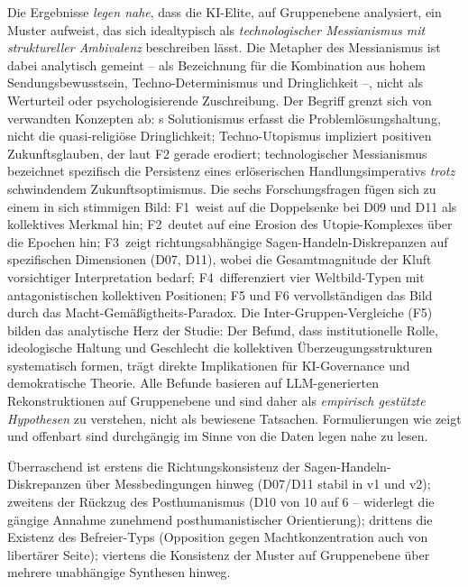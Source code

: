 \documentclass[12pt,a4paper]{article}
\begin{document}
Die Ergebnisse \emph{legen nahe}, dass die KI-Elite, auf Gruppenebene analysiert, ein Muster aufweist, das sich idealtypisch als \emph{technologischer Messianismus mit struktureller Ambivalenz} beschreiben lässt. Die Metapher des \glqq Messianismus\grqq{} ist dabei analytisch gemeint -- als Bezeichnung für die Kombination aus hohem Sendungsbewusstsein, Techno-Determinismus und Dringlichkeit --, nicht als Werturteil oder psychologisierende Zuschreibung. Der Begriff grenzt sich von verwandten Konzepten ab: \citeauthor{Morozov2013}s \glqq Solutionismus\grqq{} erfasst die Problemlösungshaltung, nicht die quasi-religiöse Dringlichkeit; \glqq Techno-Utopismus\grqq{} impliziert positiven Zukunftsglauben, der laut F2 gerade erodiert; \glqq technologischer Messianismus\grqq{} bezeichnet spezifisch die Persistenz eines erlöserischen Handlungsimperativs \emph{trotz} schwindendem Zukunftsoptimismus. Die sechs Forschungsfragen fügen sich zu einem in sich stimmigen Bild: F1~weist auf die \glqq Doppelsenke\grqq{} bei D09 und D11 als kollektives Merkmal hin; F2~deutet auf eine Erosion des Utopie-Komplexes über die Epochen hin; F3~zeigt richtungsabhängige Sagen-Handeln-Diskrepanzen auf spezifischen Dimensionen (D07, D11), wobei die Gesamtmagnitude der Kluft vorsichtiger Interpretation bedarf; F4~differenziert vier Weltbild-Typen mit antagonistischen kollektiven Positionen; F5 und F6 vervollständigen das Bild durch das Macht-Gemäßigtheits-Paradox. Die Inter-Gruppen-Vergleiche (F5) bilden das analytische Herz der Studie: Der Befund, dass institutionelle Rolle, ideologische Haltung und Geschlecht die kollektiven Überzeugungsstrukturen systematisch formen, trägt direkte Implikationen für KI-Governance und demokratische Theorie. Alle Befunde basieren auf LLM-generierten Rekonstruktionen auf Gruppenebene und sind daher als \emph{empirisch gestützte Hypothesen} zu verstehen, nicht als bewiesene Tatsachen. Formulierungen wie \glqq zeigt\grqq{} und \glqq offenbart\grqq{} sind durchgängig im Sinne von \glqq die Daten legen nahe\grqq{} zu lesen.

Überraschend ist erstens die Richtungskonsistenz der Sagen-Handeln-Diskrepanzen über Messbedingungen hinweg (D07/D11 stabil in v1 und v2); zweitens der Rückzug des Posthumanismus (D10 von 10 auf 6 -- widerlegt die gängige Annahme zunehmend posthumanistischer Orientierung); drittens die Existenz des Befreier-Typs (Opposition gegen Machtkonzentration auch von libertärer Seite); viertens die Konsistenz der Muster auf Gruppenebene über mehrere unabhängige Synthesen hinweg.
\end{document}
